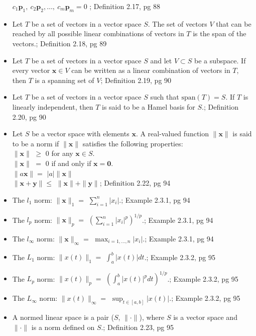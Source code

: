 \documentclass{article}
\begin{document}
\begin{multicols}{2}
\begin{itemize}
$c_1 \mathbf{p}_1,\: c_2 \mathbf{p}_2, \dots, \: c_m \mathbf{p}_m = 0$ ; Definition 2.17, pg 88
\item Let $T$ be a set of vectors in a vector space $S$. The set of vectors $V$ that can be reached by all possible linear combinations of vectors in $T$ is the span of the vectors.; Definition 2.18, pg 89
\item Let $T$ be a set of vectors in a vector space $S$ and let $V \subset S$ be a subspace. If every vector $\mathbf{x} \in V$ can be written as a linear combination of vectors in $T$, then $T$ is a spanning set of $V$; Definition 2.19, pg 90
\item Let $T$ be a set of vectors in a vector space $S$ such that $\text{span}(T) = S$. If $T$ is linearly independent, then $T$ is said to be a Hamel basis for $S$.; Definition 2.20, pg 90
\item Let $S$ be a vector space with elements $\mathbf{x}$.  A real-valued function $ \|\mathbf{x}\| $ is said to be a norm if $ \|\mathbf{x}\| $ satisfies the following properties:\\
$ \|\mathbf{x}\| $ $\geq$ $0$ for any $\mathbf{x} \in S$. \\
$ \|\mathbf{x}\| $ $=$ $0$ if and only if $ \mathbf{x} = \mathbf{0} $. \\
$ \| a\mathbf{x}\| = $ $|a|\|\mathbf{x}\| $  \\
$\|\mathbf{x} + \mathbf{y} \| \leq$ $\| \mathbf{x} \| + \| \mathbf{y}\| $; Definition 2.22, pg 94 
\item The $l_1$ norm: $\|\mathbf{x}\|_1 = $ $\sum_{i=1}^{n} |x_i|$.; Example 2.3.1, pg 94
\item The $l_p$ norm: $\|\mathbf{x}\|_p = $ $ \left(\sum_{i=1}^{n} |x_i|^p \right)^{1/p} $.; Example 2.3.1, pg 94
\item The $l_{\infty}$ norm: $\|\mathbf{x}\|_{\infty} = $ $ \max_{i=1,\dots,n}|x_i| $.; Example 2.3.1, pg 94
\item The $L_1$ norm: $\|x(t)\|_1 = $ $\int_a^b |x(t)|dt $.; Example 2.3.2, pg 95
\item The $L_p$ norm: $\|x(t)\|_p = $ $ \left(\int_a^b |x(t)|^p dt \right)^{1/p} $.; Example 2.3.2, pg 95
\item The $L_{\infty}$ norm: $\|x(t)\|_{\infty} = $ $ \sup_{t\in[a,b]}|x(t)| $.; Example 2.3.2, pg 95
\item A normed linear space is a pair ($S$, $ \|\cdot \| $), where $S$ is a vector space and $ \|\cdot \| $ is a norm defined on $S$.; Definition 2.23, pg 95

\end{itemize}
\end{multicols}
\end{document}
